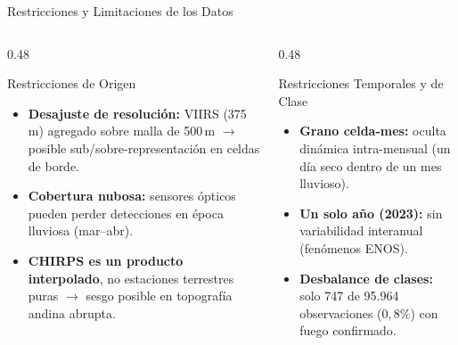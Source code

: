 \documentclass[aspectratio=169,11pt]{beamer}
\begin{document}
\begin{frame}{Restricciones y Limitaciones de los Datos}
  \begin{columns}[t]
    \begin{column}{0.48\textwidth}
      \begin{alertblock}{Restricciones de Origen}
        \begin{itemize}\small
          \item \textbf{Desajuste de resoluci\'on:} VIIRS (375\,m) agregado sobre malla de 500\,m $\rightarrow$ posible sub/sobre-representaci\'on en celdas de borde.
          \item \textbf{Cobertura nubosa:} sensores \'opticos pueden perder detecciones en \'epoca lluviosa (mar--abr).
          \item \textbf{CHIRPS es un producto interpolado}, no estaciones terrestres puras $\rightarrow$ sesgo posible en topograf\'ia andina abrupta.
        \end{itemize}
      \end{alertblock}
    \end{column}
    \begin{column}{0.48\textwidth}
      \begin{block}{Restricciones Temporales y de Clase}
        \begin{itemize}\small
          \item \textbf{Grano celda-mes:} oculta din\'amica intra-mensual (un d\'ia seco dentro de un mes lluvioso).
          \item \textbf{Un solo a\~no (2023):} sin variabilidad interanual (fen\'omenos ENOS).
          \item \textbf{Desbalance de clases:} solo 747 de 95.964 observaciones ($0{,}8\%$) con fuego confirmado.
        \end{itemize}
      \end{block}
    \end{column}
  \end{columns}
\end{frame}
\end{document}
